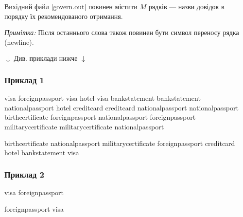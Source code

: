 \documentclass[12pt,a4paper]{article}
\begin{document}
Вихідний файл |govern.out| повинен містити \(M\) рядків --- назви довідок в порядку їх рекомендованого отримання.

\emph{Примітка:} Після останнього слова також повинен бути символ переносу рядка (newline).


\begin{pagebottomtext}
$\downarrow$ Див. приклади нижче $\downarrow$
\end{pagebottomtext}


\pagebreak


\subsubsection*{Приклад 1}

\textbf{}

\begin{codeblock}
visa foreignpassport
visa hotel
visa bankstatement
bankstatement nationalpassport
hotel creditcard
creditcard nationalpassport
nationalpassport birthcertificate
foreignpassport nationalpassport
foreignpassport militarycertificate
militarycertificate nationalpassport
\end{codeblock}

\textbf{}

\begin{codeblock}
birthcertificate
nationalpassport
militarycertificate
foreignpassport
creditcard
hotel
bankstatement
visa
\end{codeblock}


\subsubsection*{Приклад 2}

\textbf{}

\begin{codeblock}
visa foreignpassport
\end{codeblock}

\textbf{}

\begin{codeblock}
foreignpassport
visa
\end{codeblock}
\end{document}
